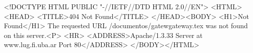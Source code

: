 <!DOCTYPE HTML PUBLIC "-//IETF//DTD HTML 2.0//EN">
<HTML><HEAD>
<TITLE>404 Not Found</TITLE>
</HEAD><BODY>
<H1>Not Found</H1>
The requested URL /documentos/gatewgateway.tex was not found on this server.<P>
<HR>
<ADDRESS>Apache/1.3.33 Server at www.lug.fi.uba.ar Port 80</ADDRESS>
</BODY></HTML>
